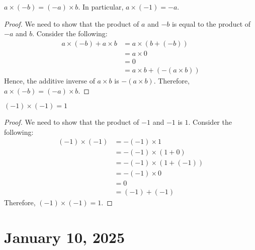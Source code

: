 \documentclass[11pt]{article}
\begin{document}
\begin{proposition}
    $a \times (-b) = (-a) \times b$. In particular, $a \times (-1) = -a$.
\end{proposition}

\begin{proof}
    We need to show that the product of $a$ and $-b$ is equal to the product of $-a$ and $b$. Consider the following:
    \begin{align*}
        a \times (-b) + a \times b & = a \times (b + (-b))          \\
                                   & = a \times 0                   \\
                                   & = 0                            \\
                                   & = a \times b + (-(a \times b))
    \end{align*}
    Hence, the additive inverse of $a \times b$ is $-(a \times b)$. Therefore, $a \times (-b) = (-a) \times b$.
\end{proof}

\begin{proposition}
    $(-1) \times (-1) = 1$
\end{proposition}

\begin{proof}
    We need to show that the product of $-1$ and $-1$ is $1$. Consider the following:
    \begin{align*}
        (-1) \times (-1) & = -(-1) \times 1          \\
                         & = -(-1) \times (1 + 0)    \\
                         & = -(-1) \times (1 + (-1)) \\
                         & = -(-1) \times 0          \\
                         & = 0                       \\
                         & = (-1) + (-1)
    \end{align*}
    Therefore, $(-1) \times (-1) = 1$.
\end{proof}

\section{January 10, 2025}
\end{document}
